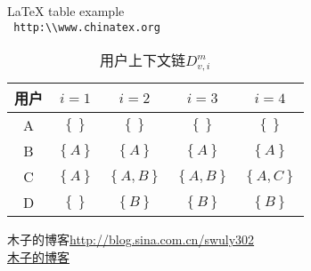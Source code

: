 \documentclass[UTF8]{ctexart}
\begin{document}
LaTeX table example\\
\verb= http:\\www.chinatex.org=\\
\begin{table}[!hbp]
\centering
\begin{tabular}{|c|c|c|c|c|}
\hline
\hline
 用户 &  $i=1$ &  $i=2$ &  $i=3$ &  $i=4$ \\
\hline
 A &  $\left \{  \right \}$ &  $\left \{  \right \}$ & $\left \{  \right \}$  &  $\left \{  \right \} $\\
\hline
 B &  $\left \{ A \right \}$ &  $\left \{ A \right \}$ &  $\left \{ A \right \}$ &  $\left \{ A \right \}$ \\
\hline
 C &  $\left \{ A \right \}$ &  $\left \{ A,B \right \}$ &  $\left \{ A,B \right \}$ &  $\left \{ A,C \right \}$ \\
\hline
 D &  $\left \{  \right \}$ &  $\left \{ B \right \}$ &  $\left \{ B \right \}$ &  $\left \{ B \right \}$ \\
\end{tabular}
\caption{用户上下文链$D_{v,i}^{m}$}
\end{table}
木子的博客\url{http://blog.sina.com.cn/swuly302}\\
\href{http://blog.sina.com.cn/swuly302}{木子的博客}
\end{document}
